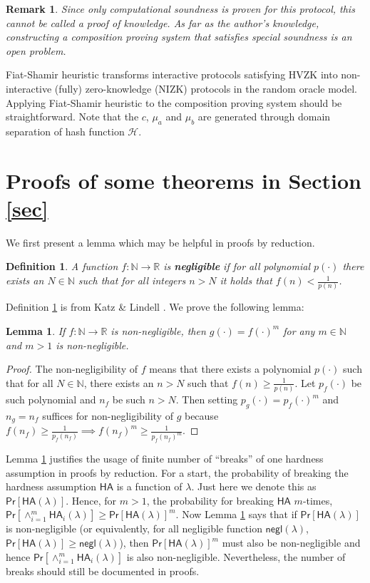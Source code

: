 \documentclass{article}
\newtheorem{definition}{Definition}[section]
\newtheorem{lemma}[theorem]{Lemma}
\newtheorem*{remark}{Remark}
\begin{document}
\begin{remark}
{\normalfont
Since only computational soundness is proven for this protocol, this cannot be called a proof of knowledge. As far as the author's knowledge, constructing a composition proving system that satisfies special soundness is an open problem.}
\end{remark}

Fiat-Shamir heuristic transforms interactive protocols satisfying HVZK into non-interactive (fully) zero-knowledge (NIZK) protocols in the random oracle model. Applying Fiat-Shamir heuristic to the composition proving system should be straightforward. Note that the $c$, $\mu_a$ and $\mu_b$ are generated through domain separation of hash function $\mathcal{H}$.

\section{Proofs of some theorems in Section \ref{sec}}\label{proofs}
We first present a lemma which may be helpful in proofs by reduction.

\begin{definition}\label{negl}
A function $f:\mathbb{N}\rightarrow\mathbb{R}$ is \textbf{\em negligible} if for all polynomial $p(\cdot)$ there exists an $N\in\mathbb{N}$ such that for all integers $n>N$ it holds that $f(n)<\frac{1}{p(n)}$.
\end{definition}
\noindent Definition \ref{negl} is from Katz \& Lindell \cite{katz-lindell}. We prove the following lemma:

\begin{lemma}\label{negl-exp}
If $f:\mathbb{N}\rightarrow\mathbb{R}$ is non-negligible, then $g(\cdot)=f(\cdot)^m$ for any $m\in\mathbb{N}$ and $m>1$ is non-negligible.
\end{lemma}
\begin{proof}
The non-negligibility of $f$ means that there exists a polynomial $p(\cdot)$ such that for all $N\in\mathbb{N}$, there exists an $n>N$ such that $f(n)\ge\frac{1}{p(n)}$. Let $p_f(\cdot)$ be such polynomial and $n_f$ be such $n>N$. Then setting $p_g(\cdot)=p_f(\cdot)^m$ and $n_g=n_f$ suffices for non-negligibility of $g$ because $f(n_f)\ge\frac{1}{p_f(n_f)}\implies f(n_f)^m\ge\frac{1}{p_f(n_f)^m}$.
\end{proof}
\noindent Lemma \ref{negl-exp} justifies the usage of finite number of ``breaks'' of one hardness assumption in proofs by reduction. For a start, the probability of breaking the hardness assumption $\textsf{HA}$ is a function of $\lambda$. Just here we denote this as $\textsf{Pr}[\textsf{HA}(\lambda)]$. Hence, for $m>1$, the probability for breaking $\textsf{HA}$ $m$-times, $\textsf{Pr}[\wedge_{i=1}^{m}{\textsf{HA}_i(\lambda)}]\ge\textsf{Pr}[\textsf{HA}(\lambda)]^m$. Now Lemma \ref{negl-exp} says that if $\textsf{Pr}[\textsf{HA}(\lambda)]$ is non-negligible (or equivalently, for all negligible function $\textsf{negl}(\lambda)$, $\textsf{Pr}[\textsf{HA}(\lambda)]\ge\textsf{negl}(\lambda)$), then $\textsf{Pr}[\textsf{HA}(\lambda)]^m$ must also be non-negligible and hence $\textsf{Pr}[\wedge_{i=1}^{m}{\textsf{HA}_i(\lambda)}]$ is also non-negligible. Nevertheless, the number of breaks should still be documented in proofs.
\end{document}
